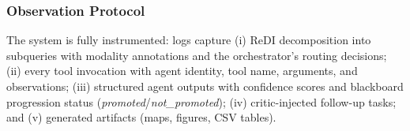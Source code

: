 \subsubsection{Observation Protocol}

The system is fully instrumented: logs capture (i) ReDI decomposition into subqueries with modality annotations and the orchestrator’s routing decisions; (ii) every tool invocation with agent identity, tool name, arguments, and observations; (iii) structured agent outputs with confidence scores and blackboard progression status (\emph{promoted}/\emph{not\_promoted}); (iv) critic-injected follow-up tasks; and (v) generated artifacts (maps, figures, CSV tables).